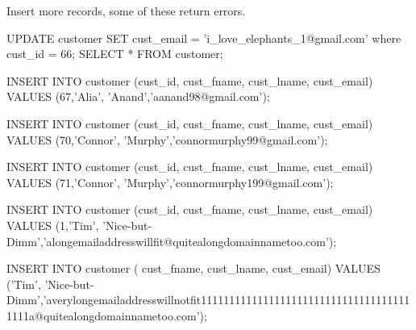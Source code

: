Insert more records, some of these return errors.
\begin{sql}
UPDATE customer SET cust_email = 'i_love_elephants_1@gmail.com' where cust_id = 66;
SELECT * FROM customer;

INSERT INTO customer (cust_id, cust_fname, cust_lname, cust_email) VALUES (67,'Alia', 'Anand','aanand98@gmail.com');

INSERT INTO customer (cust_id, cust_fname, cust_lname, cust_email) VALUES (70,'Connor', 'Murphy','connormurphy99@gmail.com');

INSERT INTO customer (cust_id, cust_fname, cust_lname, cust_email) VALUES (71,'Connor', 'Murphy','connormurphy199@gmail.com');

INSERT INTO customer (cust_id, cust_fname, cust_lname, cust_email) VALUES (1,'Tim', 'Nice-but-Dimm','alongemailaddresswillfit@quitealongdomainnametoo.com');

INSERT INTO customer ( cust_fname, cust_lname, cust_email) VALUES ('Tim', 'Nice-but-Dimm','averylongemailaddresswillnotfit11111111111111111111111111111111111111111a@quitealongdomainnametoo.com');
\end{sql}


